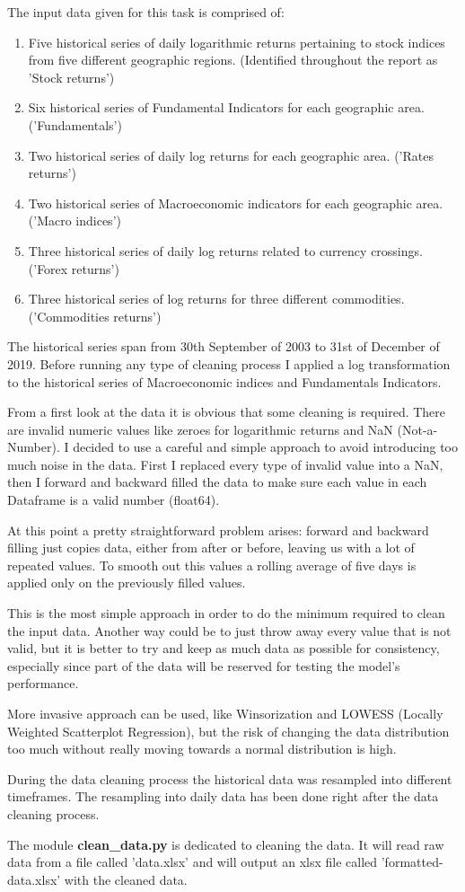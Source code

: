 The input data given for this task is comprised of:
\begin{enumerate}
    \item Five historical series of daily logarithmic returns pertaining to stock indices from five different geographic regions. (Identified throughout the report as 'Stock returns')
    \item Six historical series of Fundamental Indicators for each geographic area. ('Fundamentals')
    \item Two historical series of daily log returns for each geographic area. ('Rates returns')
    \item Two historical series of Macroeconomic indicators for each geographic area. ('Macro indices')
    \item Three historical series of daily log returns related to currency crossings. ('Forex returns')
    \item Three historical series of log returns for three different commodities. ('Commodities returns')
\end{enumerate}
The historical series span from 30th September of 2003 to 31st of December of 2019. Before running any type of cleaning process I applied a log transformation to the historical series of Macroeconomic indices and Fundamentals Indicators.


From a first look at the data it is obvious that some cleaning is required. There are invalid numeric values like zeroes for logarithmic returns and NaN (Not-a-Number). I decided to use a careful and simple approach to avoid introducing too much noise in the data. First I replaced every type of invalid value into a NaN, then I forward and backward filled the data to make sure each value in each Dataframe is a valid number (float64). 


At this point a pretty straightforward problem arises: forward and backward filling just copies data, either from after or before, leaving us with a lot of repeated values. To smooth out this values a rolling average of five days is applied only on the previously filled values.


This is the most simple approach in order to do the minimum required to clean the input data. Another way could be to just throw away every value that is not valid, but it is better to try and keep as much data as possible for consistency, especially since part of the data will be reserved for testing the model's performance.


More invasive approach can be used, like Winsorization and LOWESS (Locally Weighted Scatterplot Regression), but the risk of changing the data distribution too much without really moving towards a normal distribution is high.

During the data cleaning process the historical data was resampled into different timeframes. The resampling into daily data has been done right after the data cleaning process.

The module \textbf{clean\_data.py} is dedicated to cleaning the data. It will read raw data from a file called 'data.xlsx' and will output an xlsx file called 'formatted-data.xlsx' with the cleaned data.